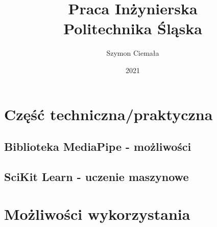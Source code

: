 \documentclass[a4paper,12pt]{report}
\title{Praca Inżynierska\\{\Large Politechnika Śląska}}
\author{Szymon Ciemała}
\date{2021}
\begin{document}
\maketitle

\tableofcontents





\chapter{Część techniczna/praktyczna}
\section{Biblioteka MediaPipe - możliwości}
\section{SciKit Learn - uczenie maszynowe}

\chapter{Możliwości wykorzystania}
\end{document}
